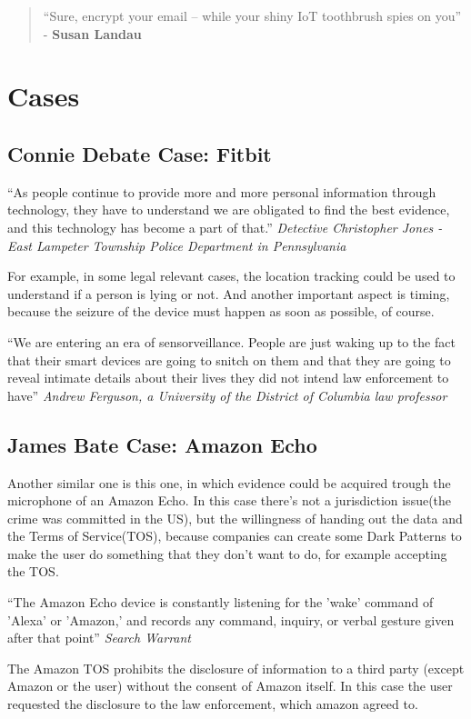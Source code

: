 \begin{quote}
    “Sure, encrypt your email – while your shiny IoT toothbrush spies
    on you” - \textbf{Susan Landau}
\end{quote}

\section{Cases}

\subsection{Connie Debate Case: Fitbit}

“As people continue to provide more and more personal information
through technology, they have to understand we are obligated to find
the best evidence, and this technology has become a part of that.”
\textit{Detective Christopher Jones - East Lampeter Township Police
Department in Pennsylvania}

For example, in some legal relevant cases, the location tracking could
be used to understand if a person is lying or not. And another
important aspect is timing, because the seizure of the device must
happen as soon as possible, of course.

“We are entering an era of sensorveillance. People are just waking up
to the fact that their smart devices are going to snitch on them and
that they are going to reveal intimate details about their lives they
did not intend law enforcement to have”  \textit{Andrew Ferguson, a
University of the District of Columbia law professor}

\subsection{James Bate Case: Amazon Echo}
Another similar one is this one, in which evidence could be acquired
trough the microphone of an Amazon Echo. In this case there's not a
jurisdiction issue(the crime was committed in the US), but the
willingness of handing out the data and the Terms of Service(TOS),
because companies can create some Dark Patterns to make the user 
do something that they don't want to do, for example accepting the
TOS.

“The Amazon Echo device is constantly listening for the 'wake' command
of 'Alexa' or 'Amazon,' and records any command, inquiry, or verbal
gesture given after that point”  \textit{Search Warrant}

The Amazon TOS prohibits the disclosure of information to a third
party (except Amazon or the user) without the consent of Amazon
itself. In this case the user requested the disclosure to the law
enforcement, which amazon agreed to.

